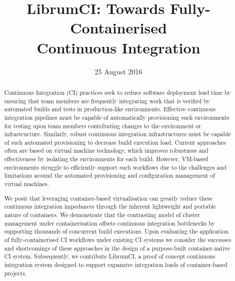 \documentclass[journal]{IEEEtran}
\begin{document}
\title{LibrumCI: Towards Fully-Containerised\\ Continuous Integration}

\author{
}
    
\date{25 August 2016}

\maketitle

\begin{abstract}
Continuous Integration (CI) practices seek to reduce software deployment lead time
by ensuring that team members are frequently integrating work that is 
verified by automated builds and tests in production-like environments. 
Effective continuous integration pipelines must be capable of automatically
provisioning such environments for testing upon team members contributing 
changes to the environment or infrastructure. Similarly,
robust continuous integration infrastructures must be capable of such
automated provisioning to decrease build execution load. 
Current approaches often are based on virtual machine technology,
 which improves robustness and effectiveness by isolating the environments for each build. 
However, VM-based environments struggle to efficiently support such workflows due to the 
challenges and limitations  around the automated provisioning and configuration management of virtual machines.
\par
We posit that leveraging container-based virtualisation can greatly reduce
these continuous integration impedances through the inherent lightweight and portable nature of containers. 
We demonstrate that the contrasting model of cluster management under containerisation offsets continuous
integration bottlenecks by supporting thousands of concurrent build executions.
Upon evaluating the application of fully-containerised CI workflows under existing CI systems 
we consider the successes and shortcomings of these approaches in the design of a purpose-built container-native
CI system. Subsequently, we contribute LibrumCI, a proof of concept continuous integration system designed 
to support expansive integration loads of container-based projects. 
\end{abstract}
\end{document}
